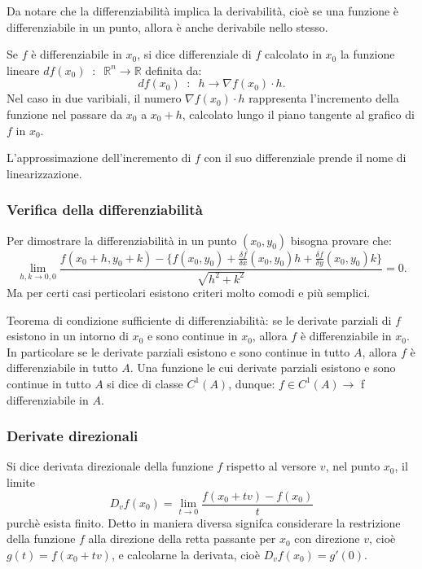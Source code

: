 Da notare che la differenziabilità implica la derivabilità, cioè se una funzione è differenziabile in un punto, allora è anche derivabile nello stesso.\newline

Se $f$ è differenziabile in $x_0$, si dice differenziale di $f$ calcolato in $x_0$ la funzione lineare $df(x_0) \;\;:\;\; \mathbb{R}^n \rightarrow  \mathbb{R}$ definita da:
\[
    df(x_0) \;\;:\;\;h \rightarrow  \nabla f(x_0) \cdot h.
\] 
Nel caso in due varibiali, il numero $\nabla f(x_0) \cdot h$ rappresenta l'incremento della funzione nel passare da $x_0$ a $x_0+h$, calcolato lungo il piano tangente al grafico di $f$ in $x_0$.\newline

L'approssimazione dell'incremento di $f$ con il suo differenziale prende il nome di linearizzazione.

\subsubsection*{Verifica della differenziabilità}
Per dimostrare la differenziabilità in un punto $(x_0,y_0)$ bisogna provare che:
\[
    \lim_{h,k\rightarrow 0,0}\frac{f(x_0+h, y_0+k)-\{
        f(x_0,y_0)+ \frac{\delta f}{\delta x}(x_0,y_0) h + \frac{\delta f}{\delta y}(x_0,y_0)k
        \}}{\sqrt{h^2+k^2}} =0.
\]
Ma per certi casi perticolari esistono criteri molto comodi e più semplici.\newline

Teorema di condizione sufficiente di differenziabilità: se le derivate parziali di $f$ esistono in un intorno di $x_0$ e sono continue in $x_0$, allora $f$ è differenziabile in $x_0$.\newline
In particolare se le derivate parziali esistono e sono continue in tutto $A$, allora $f$ è differenziabile in tutto $A$.\newline
Una funzione le cui derivate parziali esistono e sono continue in tutto $A$ si dice di classe $C^1(A)$, dunque: $f \in C^1(A) \rightarrow$ f differenziabile in $A$.
\subsubsection*{Derivate direzionali}
Si dice derivata direzionale della funzione $f$ rispetto al versore $v$, nel punto $x_0$, il limite
\[
    D_vf(x_0) = \lim_{t\rightarrow 0}\frac{f(x_0 + tv) - f(x_0)}{t}
\]
purchè esista finito.\newline
Detto in maniera diversa signifca considerare la restrizione della funzione $f$ alla direzione della retta passante per $x_0$ con direzione $v$, cioè $g(t)= f(x_0+tv)$, e calcolarne la derivata, cioè $D_vf(x_0)= g'(0)$.\newline

